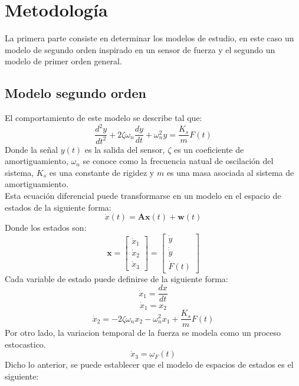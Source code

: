 \documentclass[conference]{IEEEtran}
\begin{document}
\section{Metodolog\'ia}


La primera parte consiste en determinar los modelos de estudio, en este caso un modelo de segundo orden inspirado en un sensor de fuerza y el segundo un modelo de primer orden general.

\subsection{Modelo segundo orden}


El comportamiento de este modelo se describe tal que:\\
\begin{equation}
	\frac{d^2y}{dt^2} + 2\zeta\omega_n \frac{dy}{dt} + \omega_n^2 y = \frac{K_s}{m} F(t)
\end{equation}
Donde la se\~nal $y(t)$ es la salida del sensor, $\zeta$ es un coeficiente de amortiguamiento, $\omega_n$ se conoce como la frecuencia natual de oscilaci\'on del sistema, ${K_s}$ es una constante de rigidez y $m$ es una masa asociada al sistema de amortiguamiento.\\

Esta ecuaci\'on diferencial puede transformarse en un modelo en el espacio de estados de la siguiente forma:
\[
\dot{x}(t) = \mathbf{A}\mathbf{x}(t) + \mathbf{w}(t)
\]
Donde los estados son:
\[
	\mathbf{x} = 
	\begin{bmatrix}
	\dot{x}_1 \\
	\dot{x}_2 \\
	\dot{x}_3
	\end{bmatrix} =
	\begin{bmatrix}
		\dot{y} \\
		\dot\dot{y} \\
		\dot{F}(t)
	\end{bmatrix}
\]
Cada variable de estado puede definirse de la siguiente forma:
\[
	\dot{x}_1 = \frac{ dx}{dt}
\]
\[
	\dot{x}_1 = x_2
\]
\[
	\dot{x}_2 = -2\zeta\omega_n x_2 - \omega_n^2x_1 + \frac{K_s}{m}F(t)
\]
Por otro lado, la variacion temporal de la fuerza se modela como un proceso estocastico.
\[
	\dot{x}_3 =  \omega_{F}(t)
\]
Dicho lo anterior, se puede establecer que el modelo de espacios de estados es el siguiente:
\end{document}
